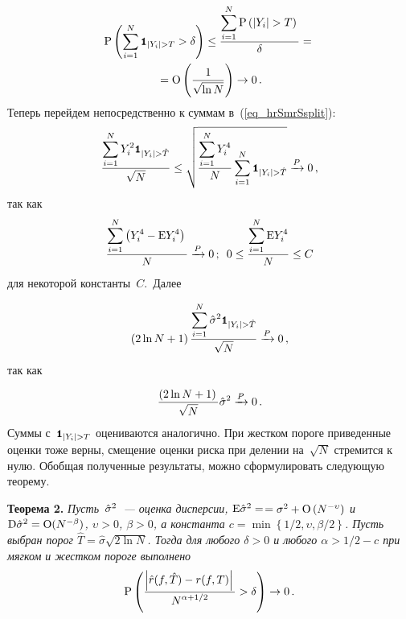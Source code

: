 \begin{multicols}{2}
\noindent
\begin{multline*}
\prbblty\left(\sum_{i=1}^{N}\indYigT>\delta\right)\leq
\fr{\sum\limits_{i=1}^{N}\prbblty\left(|Y_i|>T\right)}{\delta}={}\\
{}=
\Obig\left(\fr{1}{\sqrt{\ln N}}\right)\rightarrow 0\,.
\end{multline*}
Теперь перейдем непосредственно к суммам в~(\ref{eq_hrSmrSsplit}):
\begin{equation*}
\fr{\sum\limits_{i=1}^{N}Y_i^2\indYighT}{\sqrt{N}} \leq \sqrt{ \fr{\sum\limits_{i=1}^{N}Y_i^4}{N}
\sum\limits_{i=1}^{N}\indYighT }\xrightarrow{P}0\,,
\end{equation*}
так как
\begin{equation*}
\displaystyle\frac{\displaystyle \sum\limits_{i=1}^{N}\left(Y_i^4-\textrm{E} Y_i^4\right)\mathstrut}{\displaystyle N\mathstrut}\xrightarrow{P}0\,;\enskip
0\leq\displaystyle\frac{\displaystyle \sum\limits_{i=1}^{N}\textrm{E} Y_i^4\mathstrut}{\displaystyle N\mathstrut}\leq C
\end{equation*}
для некоторой константы~$C$.\ 
Далее
\pagebreak

\noindent
\begin{equation*}
\left(2\ln N+1\right)\fr{\sum\limits_{i=1}^{N}\hsig\indYighT}{\sqrt{N}}\xrightarrow{P}0\,,
\end{equation*}
так как

\noindent
\begin{equation*}
\displaystyle\frac{\displaystyle \left(2\ln N+1\right)\mathstrut}{\displaystyle \sqrt{N}\mathstrut}\hat\sigma^2\xrightarrow{P}0\,.
\end{equation*}
Суммы с~$\indYigT$ оцениваются аналогично. При жестком пороге приведенные оценки тоже верны, 
смещение оценки риска при делении на~$\sqrt{N}$ стремится к нулю. Обобщая полученные результаты, 
можно сформулировать следующую теорему.

\smallskip

\noindent
\textbf{Теорема 2.} \textit{Пусть~$\hat\sigma^2$~--- оценка дисперсии, 
$\textrm{E}\hat\sigma^2=$\linebreak $=\sigma^2+\textrm{O}\left(N^{-\upsilon}\right)$ и 
$\textrm{D}\hat\sigma^2=\textrm{O}(N^{-\beta})$, $\upsilon>0$, $\beta>0$, 
а константа $c=\min\left\{1/2, \upsilon, \beta/2 \right\}$. 
Пусть выбран порог $\hat T=\hat\sigma\sqrt{2\ln N}$. 
Тогда для любого $\delta>0$ и любого $\alpha > 1/2-c$ при мягком и жестком пороге выполнено
\begin{equation*}
\textrm{P}\left(\displaystyle\frac{\displaystyle \left|\hat r(f,\hat T)-r(f,T)\right|\mathstrut}{\displaystyle N^{\alpha+1/2}\mathstrut}>\delta\right)\rightarrow 0\,.
\end{equation*}
}

\vspace*{-4pt}


\end{multicols}
